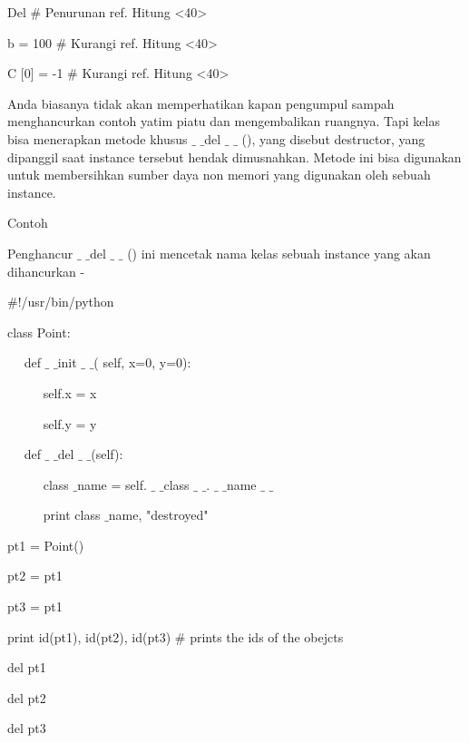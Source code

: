 \begin{12pt}
\begin{12pt}
\begin{12pt}
\begin{12pt}
\begin{12pt}
\begin{12pt}
\begin{12pt}
\begin{12pt}
\begin{12pt}
\begin{12pt}
\begin{12pt}
\begin{12pt}
\begin{12pt}
\begin{12pt}
\begin{12pt}
\begin{12pt}
\vspace{12pt}
\noindent 
Del  $  \#  $ Penurunan ref. Hitung <40> \par
\noindent 
b = 100  $  \#  $ Kurangi ref. Hitung <40> \par
\noindent 
C [0] = -1  $  \#  $ Kurangi ref. Hitung <40> \par
\vspace{12pt}
Anda biasanya tidak akan memperhatikan kapan pengumpul sampah menghancurkan contoh yatim piatu dan mengembalikan ruangnya. Tapi kelas bisa menerapkan metode khusus  $  \_  $ $  \_  $del  $  \_  $ $  \_  $ (), yang disebut destructor, yang dipanggil saat instance tersebut hendak dimusnahkan. Metode ini bisa digunakan untuk membersihkan sumber daya non memori yang digunakan oleh sebuah instance. \par
\noindent 
Contoh \par
\vspace{12pt}
\noindent 
Penghancur  $  \_  $ $  \_  $del  $  \_  $ $  \_  $ () ini mencetak nama kelas sebuah instance yang akan dihancurkan - \par
\noindent 
 $  \#  $!/usr/bin/python \par
\vspace{12pt}
\noindent 
class Point: \par
\noindent 
~~ def  $  \_  $ $  \_  $init $  \_  $ $  \_  $( self, x=0, y=0): \par
\noindent 
~~~~~ self.x = x \par
\noindent 
~~~~~ self.y = y \par
\noindent 
~~ def  $  \_  $ $  \_  $del $  \_  $ $  \_  $(self): \par
\noindent 
~~~~~ class $  \_  $name = self. $  \_  $ $  \_  $class $  \_  $ $  \_  $. $  \_  $ $  \_  $name $  \_  $ $  \_  $ \par
\noindent 
~~~~~ print class $  \_  $name, "destroyed" \par
\vspace{12pt}
\noindent 
pt1 = Point() \par
\noindent 
pt2 = pt1 \par
\noindent 
pt3 = pt1 \par
\noindent 
print id(pt1), id(pt2), id(pt3)  $  \#  $ prints the ids of the obejcts \par
\noindent 
del pt1 \par
\noindent 
del pt2 \par
\noindent 
del pt3 \par
\vspace{12pt}

\end{12pt}
\end{12pt}
\end{12pt}
\end{12pt}
\end{12pt}
\end{12pt}
\end{12pt}
\end{12pt}
\end{12pt}
\end{12pt}
\end{12pt}
\end{12pt}
\end{12pt}
\end{12pt}
\end{12pt}
\end{12pt}
